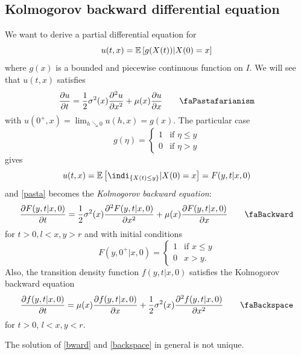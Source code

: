 \documentclass[12pt]{report}
\begin{document}
\subsection{Kolmogorov backward differential equation}
We want to derive a partial differential equation for 
\begin{equation*}
	u(t,x)=\mathbb{E}\left[g(X(t))|X(0)=x\right]
\end{equation*}
where $g(x)$ is a bounded and piecewise continuous function on $I$. We will see that $u(t,x)$ satisfies
\begin{equation}
	\frac{\partial u}{\partial t}=\unmezz\sigma^{2}(x)\frac{\partial^{2}u}{\partial x^{2}}+\mu(x)\frac{\partial u}{\partial x}\tag*{\faPastafarianism}\label{pasta}
\end{equation}
with $u(0^{+},x)=\lim_{h\searrow0} u(h,x)=g(x)$. The particular case
\begin{equation*}
	g(\eta)=\begin{cases}
		1&\text{if }\eta\leq y\\
		0&\text{if }\eta>y
	\end{cases}
\end{equation*}
gives
\begin{equation*}
	u(t,x)=\ev{\indi_{\{X(t)\leq y\}}|X(0)=x}=F(y,t|x,0)
\end{equation*}
and \ref{pasta} becomes the \emph{Kolmogorov backward equation}:
\begin{equation*}
	\frac{\partial F(y,t|x,0)}{\partial t}=\unmezz\sigma^{2}(x)\frac{\partial^{2}F(y,t|x,0)}{\partial x^{2}}+\mu(x)\frac{\partial F(y,t|x,0)}{\partial x}\tag*{\faBackward}\label{bward}
\end{equation*}for $t>0,l<x,y>r$ and with initial conditions
\begin{equation*}
	F(y,0^{+}|x,0)=\begin{cases}
		1&\text{if }x\leq y\\
		0&x>y.
	\end{cases}
\end{equation*}
Also, the transition density function $f(y,t|x,0)$ satisfies the Kolmogorov backward equation
\begin{equation*}
	\frac{\partial f(y,t|x,0)}{\partial t}=\mu(x)\frac{\partial f(y,t|x,0)}{\partial x}+\unmezz\sigma^{2}(x)\frac{\partial^{2}f(y,t|x,0)}{\partial x^{2}}\tag*{\faBackspace}\label{backspace}
\end{equation*}
for $t>0$, $l<x,y<r$.
\begin{remark}
	The solution of \ref{bward} and \ref{backspace} in general is not unique.
\end{remark}
\end{document}
